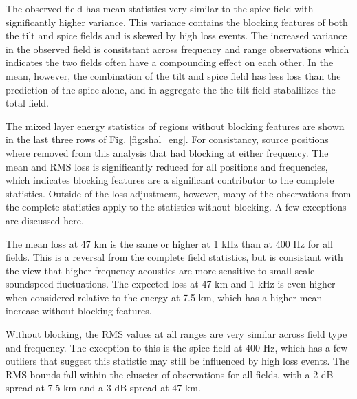 \documentclass[preprint,NumberedRefs]{JASA}
\begin{document}
The observed field has mean statistics very similar to the spice field with significantly higher variance. This variance contains the blocking features of both the tilt and spice fields and is skewed by high loss events. The increased variance in the observed field is consitstant across frequency and range observations which indicates the two fields often have a compounding effect on each other. In the mean, however, the combination of the tilt and spice field has less loss than the prediction of the spice alone, and in aggregate the the tilt field stabalilizes the total field.

The mixed layer energy statistics of regions without blocking features are shown in the last three rows of Fig. \ref{fig:shal_eng}. For consistancy, source positions where removed from this analysis that had blocking at either frequency. The mean and RMS loss is significantly reduced for all positions and frequencies, which indicates blocking features are a significant contributor to the complete statistics. Outside of the loss adjustment, however, many of the observations from the complete statistics apply to the statistics without blocking. A few exceptions are discussed here.

The mean loss at 47 km is the same or higher at 1 kHz than at 400 Hz for all fields. This is a reversal from the complete field statistics, but is consistant with the view that higher frequency acoustics are more sensitive to small-scale soundspeed fluctuations. The expected loss at 47 km and 1 kHz is even higher when considered relative to the energy at 7.5 km, which has a higher mean increase without blocking features.

Without blocking, the RMS values at all ranges are very similar across field type and frequency. The exception to this is the spice field at 400 Hz, which has a few outliers that suggest this statistic may still be influenced by high loss events. The RMS bounds fall within the cluseter of observations for all fields, with a 2 dB spread at 7.5 km and a 3 dB spread at 47 km.
\end{document}
